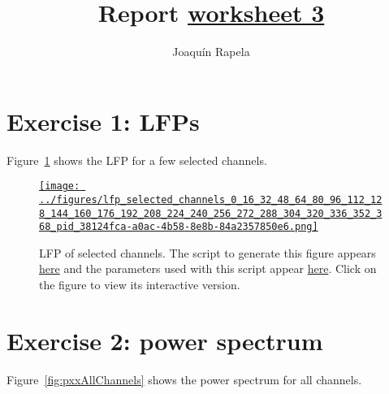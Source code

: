 \documentclass[12pt]{article}
\title{Report
\href{https://drive.google.com/file/d/1l9bymhvPO8CdKJZgVTbJih2JIliLG9mm/view?usp=share_link}{worksheet 3}}
\author{Joaqu\'{i}n Rapela}
\begin{document}
\maketitle

\section*{Exercise 1: LFPs}

Figure~\ref{fig:lfpSelectedChannels1} shows the LFP for a few selected channels.


\begin{figure}[H]
    \begin{center}
        \href{https://www.gatsby.ucl.ac.uk/~rapela/neuroinformatics/2023/ws3/figures/lfp_selected_channels_0_16_32_48_64_80_96_112_128_144_160_176_192_208_224_240_256_272_288_304_320_336_352_368_pid_38124fca-a0ac-4b58-8e8b-84a2357850e6.html}{\texttt{[image: ../figures/lfp\_selected\_channels\_0\_16\_32\_48\_64\_80\_96\_112\_128\_144\_160\_176\_192\_208\_224\_240\_256\_272\_288\_304\_320\_336\_352\_368\_pid\_38124fca-a0ac-4b58-8e8b-84a2357850e6.png]}}
        \caption{LFP of selected channels.
                The script to generate
                this figure appears
                \href{https://github.com/joacorapela/neuroinformatics23/blob/master/worksheets/ws3/mySolution/code/scripts/doPlotSomeChannelsLFPs.py}{here}
                and the parameters used with this script appear
                \href{https://github.com/joacorapela/neuroinformatics23/blob/master/worksheets/ws3/mySolution/code/scripts/doPlotSomeChannelsLFPs.csh}{here}.
                Click on the figure to view its interactive version.
                }

                \label{fig:lfpSelectedChannels1}

            \end{center}
        \end{figure}

\section*{Exercise 2: power spectrum}

Figure~\ref{fig:pxxAllChannels} shows the power spectrum for all
channels.
\end{document}
